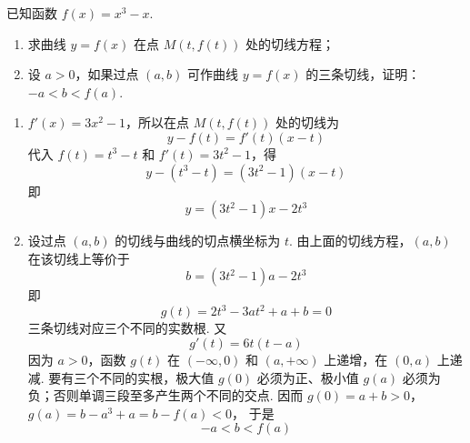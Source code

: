 \begin{problem}
已知函数 \( f(x) = x^3 - x \).
\begin{enumerate}
\item 求曲线 \( y = f(x) \) 在点 \( M(t, f(t)) \) 处的切线方程；
\item 设 \(a > 0\)，如果过点 \((a, b)\) 可作曲线 \(y = f(x)\) 的三条切线，证明：\(-a < b < f(a)\).
\end{enumerate}
\end{problem}

\begin{solution}
\begin{enumerate}
\item \(f'(x)=3x^2-1\)，所以在点 \(M(t,f(t))\) 处的切线为
\[
y-f(t)=f'(t)(x-t)
\]
代入 \(f(t)=t^3-t\) 和 \(f'(t)=3t^2-1\)，得
\[
y-(t^3-t)=(3t^2-1)(x-t)
\]
即
\[
y=(3t^2-1)x-2t^3
\]

\item 设过点 \((a,b)\) 的切线与曲线的切点横坐标为 \(t\). 由上面的切线方程，\((a,b)\) 在该切线上等价于
\[
b=(3t^2-1)a-2t^3
\]
即
\[
g(t)=2t^3-3at^2+a+b=0
\]
三条切线对应三个不同的实数根. 又
\[
g'(t)=6t(t-a)
\]
因为 \(a>0\)，函数 \(g(t)\) 在 \((-\infty,0)\) 和 \((a,+\infty)\) 上递增，在 \((0,a)\) 上递减. 要有三个不同的实根，极大值 \(g(0)\) 必须为正、极小值 \(g(a)\) 必须为负；否则单调三段至多产生两个不同的交点. 因而
\(g(0)=a+b>0\)，\(g(a)=b-a^3+a=b-f(a)<0\)，
于是
\[
-a<b<f(a)
\]
\end{enumerate}
\end{solution}
